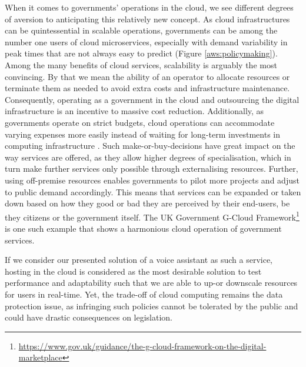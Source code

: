 When it comes to governments' operations in the cloud, we see different degrees of aversion to anticipating this relatively new concept. As cloud infrastructures can be quintessential in scalable operations, governments can be among the number one users of cloud microservices, especially with demand variability in peak times that are not always easy to predict (Figure \ref{aws:policymaking}). Among the many benefits of cloud services, scalability is arguably the most convincing. By that we mean the ability of an operator to allocate resources or terminate them as needed to avoid extra costs and infrastructure maintenance.
Consequently, operating as a government in the cloud and outsourcing the digital infrastructure is an incentive to massive cost reduction. Additionally, as governments operate on strict budgets, cloud operations can accommodate varying expenses more easily instead of waiting for long-term investments in computing infrastructure \cite{aws:pubsecsum}. Such make-or-buy-decisions have great impact on the way services are offered, as they allow higher degrees of specialisation, which in turn make further services only possible through externalising resources.
Further, using off-premise resources enables governments to pilot more projects and adjust to public demand accordingly. This means that services can be expanded or taken down based on how they good or bad they are perceived by their end-users, be they citizens or the government itself.
The UK Government G-Cloud Framework\footnote{\url{https://www.gov.uk/guidance/the-g-cloud-framework-on-the-digital-marketplace}} is one such example that shows a harmonious cloud operation of government services.

If we consider our presented solution of a voice assistant as such a service, hosting in the cloud is considered as the most desirable solution to test performance and adaptability such that we are able to up-or downscale resources for users in real-time. Yet, the trade-off of cloud computing remains the data protection issue, as infringing such policies cannot be tolerated by the public and could have drastic consequences on legislation.

